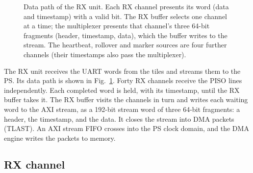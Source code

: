 \documentclass[12pt]{article}
\begin{document}
\begin{figure}[htbp]
\caption{\label{fig:rx-unit} Data path of the RX unit.  Each RX channel presents its word (data and
  timestamp) with a valid bit.  The RX buffer selects one channel at a time; the multiplexer presents that
  channel's three 64-bit fragments (header, timestamp, data), which the buffer writes to the stream.  The
  heartbeat, rollover and marker sources are four further channels (their timestamps also pass the
  multiplexer).}
\end{figure}

The RX unit receives the UART words from the tiles and streams them to the PS.  Its data path is shown in
Fig.~\ref{fig:rx-unit}.  Forty RX channels receive the PISO lines independently.  Each completed word is
held, with its timestamp, until the RX buffer takes it.  The RX buffer visits the channels in turn and writes
each waiting word to the AXI stream, as a 192-bit stream word of three 64-bit fragments: a header, the
timestamp, and the data.  It closes the stream into DMA packets (TLAST).  An AXI stream FIFO crosses into the
PS clock domain, and the DMA engine writes the packets to memory.

\subsection{RX channel}\label{sec:rx-chan}
\end{document}
